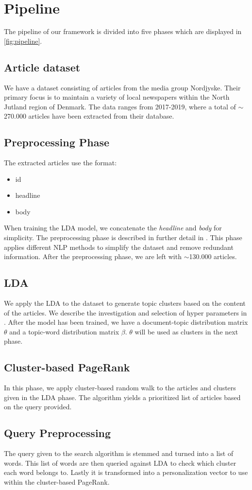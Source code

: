 \section{Pipeline}


The pipeline of our framework is divided into five phases which are displayed in \autoref{fig:pipeline}.

\subsection{Article dataset}
We have a dataset consisting of articles from the media group Nordjyske. Their primary focus is to maintain a variety of local newspapers within the North Jutland region of Denmark. 
The data ranges from 2017-2019, where a total of $\sim$270.000 articles have been extracted from their database.

\subsection{Preprocessing Phase}
The extracted articles use the format:
\begin{itemize}
	\item id
	\item headline
	\item body
\end{itemize}
When training the LDA model, we concatenate the \emph{headline} and \emph{body} for simplicity.
The preprocessing phase is described in further detail in .
This phase applies different \gls{NLP} methods to simplify the dataset and remove redundant information.
After the preprocessing phase, we are left with $\sim$130.000 articles.

\subsection{LDA}
We apply the \acrfull{LDA} to the dataset to generate topic clusters based on the content of the articles. 
We describe the investigation and selection of hyper parameters in . 
After the model has been trained, we have a document-topic distribution matrix $\theta$ and a topic-word distribution matrix $\beta$.
$\theta$ will be used as clusters in the next phase.

\subsection{Cluster-based PageRank}
In this phase, we apply cluster-based random walk to the articles and clusters given in the \gls{LDA} phase.
The algorithm yields a prioritized list of articles based on the query provided.


\subsection{Query Preprocessing}
The query given to the search algorithm is stemmed and turned into a list of words. 
This list of words are then queried against LDA to check which cluster each word belongs to.
Lastly it is transformed into a personalization vector to use within the cluster-based PageRank.

